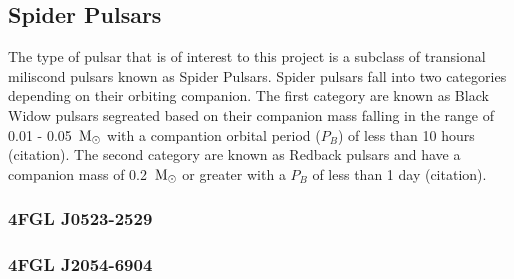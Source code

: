 \subsection{Spider Pulsars}

The type of pulsar that is of interest to this project is a subclass of transional miliscond pulsars known as Spider Pulsars. Spider pulsars fall into two categories depending on their orbiting companion. The first category are known as Black Widow pulsars segreated based on their companion mass falling in the range of 0.01 - 0.05 $\, \text{M}_\odot$ with a compantion orbital period ($P_B$) of less than 10 hours (citation). The second category are known as Redback pulsars and have a companion mass of 0.2 $\, \text{M}_\odot$ or greater with a $P_B$ of less than 1 day (citation). \\ 


\subsubsection{4FGL J0523-2529}

\subsubsection{4FGL J2054-6904}